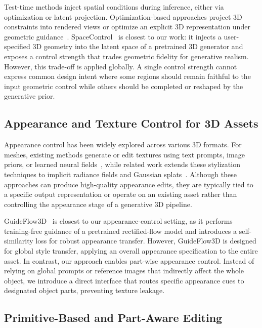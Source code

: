 Test-time methods inject spatial conditions during inference, either via optimization or latent projection. Optimization-based approaches project 3D constraints into rendered views or optimize an explicit 3D representation under geometric guidance~\cite{Metzer_2023_CVPR,10.1145/3641519.3657425}. SpaceControl~\cite{fedele2025spacecontrol} is closest to our work: it injects a user-specified 3D geometry into the latent space of a pretrained 3D generator and exposes a control strength that trades geometric fidelity for generative realism. However, this trade-off is applied globally. A single control strength cannot express common design intent where some regions should remain faithful to the input geometric control while others should be completed or reshaped by the generative prior. 

\subsection{Appearance and Texture Control for 3D Assets} 
\label{sec:rw_appearance_control}

Appearance control has been widely explored across various 3D formats. For meshes, existing methods generate or edit textures using text prompts, image priors, or learned neural fields~\cite{text2mesh, 10.1145/3588432.3591503, perla2024easitex, Cohen-Bar_2025_CVPR}, while related work extends these stylization techniques to implicit radiance fields and Gaussian splats~\cite{liu2023stylerf, liu2023stylegaussian, 10.1007/978-3-031-85187-2_15}. Although these approaches can produce high-quality appearance edits, they are typically tied to a specific output representation or operate on an existing asset rather than controlling the appearance stage of a generative 3D pipeline.

GuideFlow3D~\cite{sayandsarkar_2025_guideflow3d} is closest to our appearance-control setting, as it performs training-free guidance of a pretrained rectified-flow model and introduces a self-similarity loss for robust appearance transfer. However, GuideFlow3D is designed for global style transfer, applying an overall appearance specification to the entire asset.  In contrast, our approach enables part-wise appearance control. Instead of relying on global prompts or reference images that indirectly affect the whole object, we introduce a direct interface that routes specific appearance cues to designated object parts, preventing texture leakage.


\subsection{Primitive-Based and Part-Aware Editing}
\label{sec:rw_part_primitive_editing}

